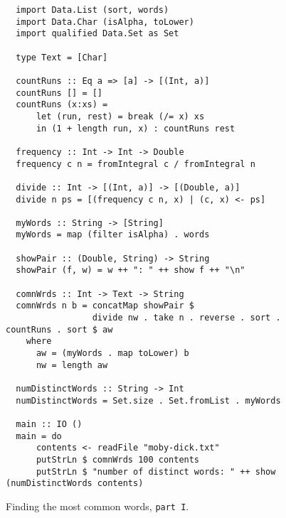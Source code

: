 \begin{figure}[!ht]
\centering
\begin{verbatim}
  import Data.List (sort, words)
  import Data.Char (isAlpha, toLower)
  import qualified Data.Set as Set

  type Text = [Char]
  
  countRuns :: Eq a => [a] -> [(Int, a)]
  countRuns [] = []
  countRuns (x:xs) =
      let (run, rest) = break (/= x) xs
      in (1 + length run, x) : countRuns rest
  
  frequency :: Int -> Int -> Double
  frequency c n = fromIntegral c / fromIntegral n 
  
  divide :: Int -> [(Int, a)] -> [(Double, a)]
  divide n ps = [(frequency c n, x) | (c, x) <- ps]
  
  myWords :: String -> [String]
  myWords = map (filter isAlpha) . words
  
  showPair :: (Double, String) -> String 
  showPair (f, w) = w ++ ": " ++ show f ++ "\n"
  
  comnWrds :: Int -> Text -> String
  comnWrds n b = concatMap showPair $
                 divide nw . take n . reverse . sort . countRuns . sort $ aw
    where
      aw = (myWords . map toLower) b
      nw = length aw

  numDistinctWords :: String -> Int
  numDistinctWords = Set.size . Set.fromList . myWords 
      
  main :: IO ()
  main = do
      contents <- readFile "moby-dick.txt"
      putStrLn $ comnWrds 100 contents
      putStrLn $ "number of distinct words: " ++ show (numDistinctWords contents)
\end{verbatim} 
\vspace*{-0.3cm}
\caption{Finding the most common words, \texttt{part \texttt{I}}.}
\label{fig:common-words.hs}
\end{figure} %



